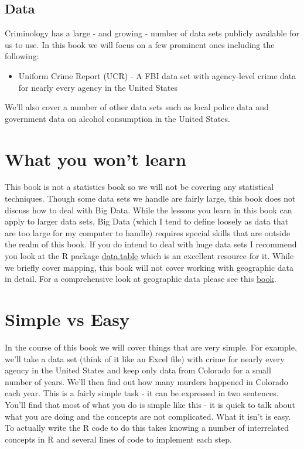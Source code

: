 \documentclass[
  12pt,
]{book}
\providecommand{\tightlist}{%
  \setlength{\itemsep}{0pt}\setlength{\parskip}{0pt}}
\begin{document}
\hypertarget{data}{%
\subsection*{Data}\label{data}}

Criminology has a large - and growing - number of data sets publicly available for us to use. In this book we will focus on a few prominent ones including the following:

\begin{itemize}
\tightlist
\item
  Uniform Crime Report (UCR) - A FBI data set with agency-level crime data for nearly every agency in the United States
\end{itemize}

We'll also cover a number of other data sets such as local police data and government data on alcohol consumption in the United States.

\hypertarget{what-you-wont-learn}{%
\section*{What you won't learn}\label{what-you-wont-learn}}

This book is not a statistics book so we will not be covering any statistical techniques. Though some data sets we handle are fairly large, this book does not discuss how to deal with Big Data. While the lessons you learn in this book can apply to larger data sets, Big Data (which I tend to define loosely as data that are too large for my computer to handle) requires special skills that are outside the realm of this book. If you do intend to deal with huge data sets I recommend you look at the R package \href{https://github.com/Rdatatable/data.table/wiki}{data.table} which is an excellent resource for it. While we briefly cover mapping, this book will not cover working with geographic data in detail. For a comprehensive look at geographic data please see this \href{https://geocompr.robinlovelace.net/}{book}.

\hypertarget{simple-vs-easy}{%
\section*{Simple vs Easy}\label{simple-vs-easy}}

In the course of this book we will cover things that are very simple. For example, we'll take a data set (think of it like an Excel file) with crime for nearly every agency in the United States and keep only data from Colorado for a small number of years. We'll then find out how many murders happened in Colorado each year. This is a fairly simple task - it can be expressed in two sentences. You'll find that most of what you do is simple like this - it is quick to talk about what you are doing and the concepts are not complicated. What it isn't is easy. To actually write the R code to do this takes knowing a number of interrelated concepts in R and several lines of code to implement each step.
\end{document}
